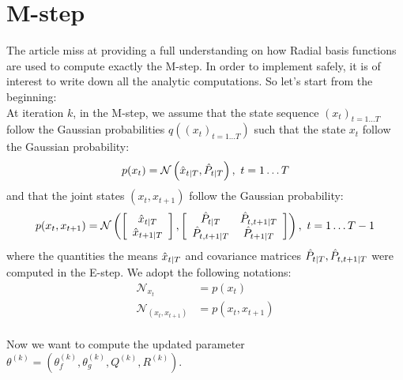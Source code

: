\section{M-step}

The article miss at providing a full understanding on how Radial basis functions are used to compute exactly the M-step. In order to implement safely, it is of interest to write down all the analytic computations. So let's start from the beginning:\\

At iteration $k$, in the M-step, we assume that the state sequence $(x_t)_{t=1 \ldots T}$ follow the Gaussian probabilities $q \left( (x_t)_{t=1 \ldots T} \right)$ such that the state $x_t$ follow the Gaussian probability:
\begin{align*}
  p(x_t) = \mathcal{N}\left( \hat{x}_{t \mathbin{\vert} T}, \hat{P}_{t \mathbin{\vert} T} \right), \  t=1 \ldots T\\
\end{align*}
and that the joint states $(x_t, x_{t+1})$ follow the Gaussian probability:
\begin{align*}
  p(x_t, x_{t+1}) &=
  \mathcal{N}
    \left(
      \left[
        \begin{array}{c} \hat{x}_{t \mathbin{\vert} T} \\ \hat{x}_{t+1 \mathbin{\vert} T} \end{array}
      \right],
      \left[
        \begin{array}{cc} \hat{P}_{t \mathbin{\vert} T} & \hat{P}_{t,t+1 \mathbin{\vert} T}\\ \hat{P}_{t,t+1 \mathbin{\vert} T} & \hat{P}_{t+1 \mathbin{\vert} T} \end{array}
      \right]
    \right), \  t=1 \ldots T-1\\
\end{align*}
where the quantities the means $\hat{x}_{t \mathbin{\vert} T}$ and covariance matrices $\hat{P}_{t \mathbin{\vert} T}, \hat{P}_{t,t+1 \mathbin{\vert} T}$ were computed in the E-step.
We adopt the following notations:
\begin{align*}
  \mathcal{N}_{x_t} &= p(x_t)\\
  \mathcal{N}_{(x_t,x_{t+1})} &= p(x_t, x_{t+1})\\
\end{align*}

Now we want to compute the updated parameter $\theta^{(k)} = \left( \theta_f^{(k)}, \theta_g^{(k)}, Q^{(k)}, R^{(k)} \right)$.

